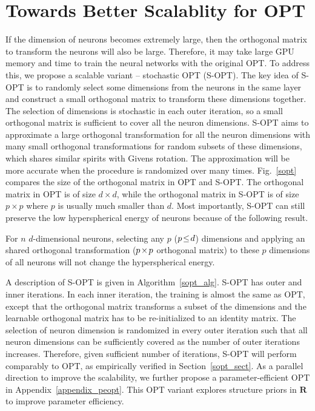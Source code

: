 \section{Towards Better Scalablity for OPT}

If the dimension of neurons becomes extremely large, then the orthogonal matrix to transform the neurons will also be large. Therefore, it may take large GPU memory and time to train the neural networks with the original OPT. To address this, we propose a scalable variant -- stochastic OPT (S-OPT). The key idea of S-OPT is to randomly select some dimensions from the neurons in the same layer and construct a small orthogonal matrix to transform these dimensions together. The selection of dimensions is stochastic in each outer iteration, so a small orthogonal matrix is sufficient to cover all the neuron dimensions. S-OPT aims to approximate a large orthogonal transformation for all the neuron dimensions with many small orthogonal transformations for random subsets of these dimensions, which shares similar spirits with Givens rotation. The approximation will be more accurate when the procedure is randomized over many times. Fig.~\ref{sopt} compares the size of the orthogonal matrix in OPT and S-OPT. The orthogonal matrix in OPT is of size $d\times d$, while the orthogonal matrix in S-OPT is of size $p\times p$ where $p$ is usually much smaller than $d$. Most importantly, S-OPT can still preserve the low hyperspherical energy of neurons because of the following result.

\begin{theorem}\label{sopt_thm}
For $n$ $d$-dimensional neurons, selecting any $p$ ($\thickmuskip=2mu \medmuskip=2mu p\leq d$) dimensions and applying an shared orthogonal transformation ($\thickmuskip=2mu \medmuskip=2mu p\times p$ orthogonal matrix) to these $p$ dimensions of all neurons will not change the hyperspherical energy.
\end{theorem}

A description of S-OPT is given in Algorithm~\ref{sopt_alg}. S-OPT has outer and inner iterations. In each inner iteration, the training is almost the same as OPT, except that the orthogonal matrix transforms a subset of the dimensions and the learnable orthogonal matrix has to be re-initialized to an identity matrix. The selection of neuron dimension is randomized in every outer iteration such that all neuron dimensions can be sufficiently covered as the number of outer iterations increases. Therefore, given sufficient number of iterations, S-OPT will perform comparably to OPT, as empirically verified in Section~\ref{sopt_sect}. As a parallel direction to improve the scalability, we further propose a parameter-efficient OPT in Appendix~\ref{appendix_peopt}. This OPT variant explores structure priors in $\bm{R}$ to improve parameter efficiency.

